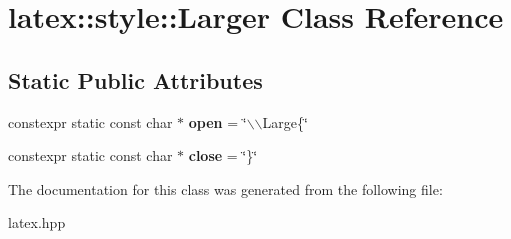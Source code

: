 \hypertarget{classlatex_1_1style_1_1Larger}{\section{latex\-:\-:style\-:\-:\-Larger \-Class \-Reference}
\label{classlatex_1_1style_1_1Larger}
}
\subsection*{\-Static \-Public \-Attributes}
\begin{DoxyCompactItemize}
\item 
\hypertarget{classlatex_1_1style_1_1Larger_aa4c8be118e5c74db90d8040a2a8c9c89}{constexpr static const char $\ast$ {\bfseries open} = \char`\"{}$\backslash$$\backslash$\-Large\{\char`\"{}}\label{classlatex_1_1style_1_1Larger_aa4c8be118e5c74db90d8040a2a8c9c89}

\item 
\hypertarget{classlatex_1_1style_1_1Larger_aa49797027b270c812f5c7ac409567e72}{constexpr static const char $\ast$ {\bfseries close} = \char`\"{}\}\char`\"{}}\label{classlatex_1_1style_1_1Larger_aa49797027b270c812f5c7ac409567e72}

\end{DoxyCompactItemize}


\-The documentation for this class was generated from the following file\-:\begin{DoxyCompactItemize}
\item 
latex.\-hpp\end{DoxyCompactItemize}
